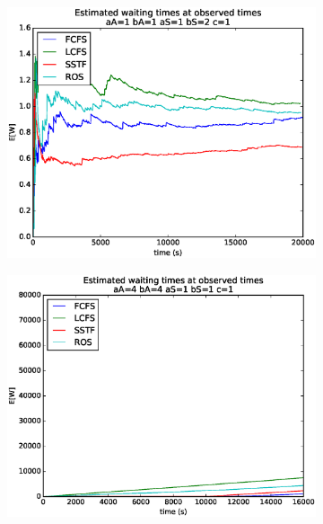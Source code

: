 \documentclass[a4paper]{article}
\begin{document}
\begin{figure}[H]
\begin{subfigure}{.5\textwidth}
  \centering
  \includegraphics[width=\linewidth]{../figures/waiting_times11121}
  \label{fig:wtaa}
\end{subfigure}
\begin{subfigure}{.5\textwidth}
  \centering
  \includegraphics[width=\linewidth]{../figures/waiting_times44111}
  \label{fig:wtaaa}
\end{subfigure}
\end{figure}
\end{document}
